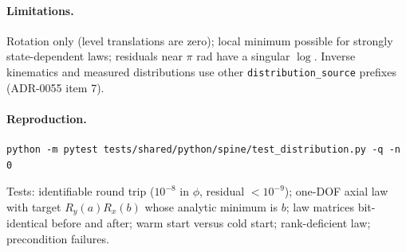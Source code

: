 \paragraph{Limitations.}
Rotation only (level translations are zero); local minimum possible for strongly
state-dependent laws; residuals near $\pi$ rad have a singular $\log$. Inverse
kinematics and measured distributions use other \texttt{distribution\_source}
prefixes (ADR-0055 item 7).

\paragraph{Reproduction.}
\begin{verbatim}
python -m pytest tests/shared/python/spine/test_distribution.py -q -n 0
\end{verbatim}
Tests: identifiable round trip ($10^{-8}$ in $\phi$, residual $<10^{-9}$);
one-DOF axial law with target $R_y(a)R_x(b)$ whose analytic minimum is $b$;
law matrices bit-identical before and after; warm start versus cold start;
rank-deficient law; precondition failures.
